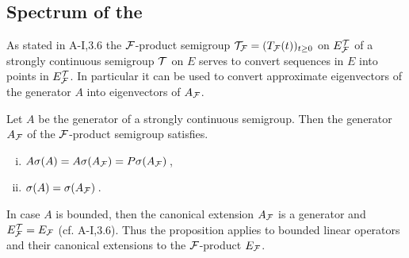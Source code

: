 \subsection{Spectrum of the }%
\label{subsec:a3-4.5}
%
As stated in A-I,3.6 the $\mathcal{F}$-product semigroup $\mathcal{T}_{\mathcal{F}} = (T_{\mathcal{F}}(t))_{t \geq 0}$ on $E_{\mathcal{F}}^{\mathcal{T}}$ of a strongly continuous semigroup $\mathcal{T}$ on $E$ serves to convert sequences in $E$ into points in $E_{\mathcal{F}}^{\mathcal{T}}$.
In particular it can be used to convert approximate eigenvectors of the generator $A$ into eigenvectors of $A_{\mathcal{F}}$.
\begin{proposition}\label{prop:a3-4.4}
Let $A$ be the generator of a strongly continuous semigroup. Then the generator $A_{\mathcal{F}}$ of the $\mathcal{F}$-product semigroup satisfies.
\begin{enumerate}[(i)]
\item 
	$A\sigma(A) = A\sigma(A_{\mathcal{F}}) = P\sigma(A_{\mathcal{F}})$\,,

\item 
	$\sigma(A) = \sigma(A_{\mathcal{F}})$\,.
\end{enumerate}
\end{proposition}
\begin{remark}
In case $A$ is bounded, then the canonical extension $A_{\mathcal{F}}$ is a generator and $E_{\mathcal{F}}^{\mathcal{T}} = E_{\mathcal{F}}$ (cf. A-I,3.6).
Thus the proposition applies to bounded linear operators and their canonical extensions to the 
$\mathcal{F}$-product $E_{\mathcal{F}}$.
\end{remark}

